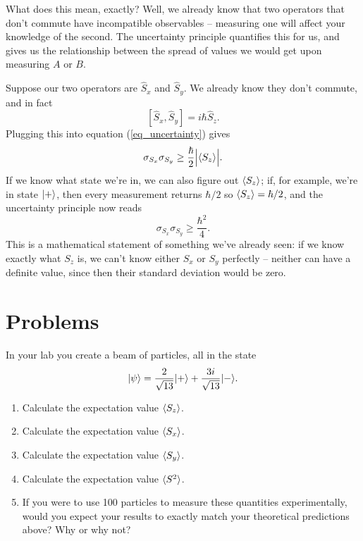 What does this mean, exactly?  Well, we already know that two operators that don't commute have incompatible observables -- measuring one will affect your knowledge of the second.  The uncertainty principle quantifies this for us, and gives us the relationship between the spread of values we would get upon measuring $A$ or $B$.  


\begin{example}

Suppose our two operators are $\hat{S}_x$ and $\hat{S}_y$.  We already know they don't commute, and in fact 
\[
[\hat{S}_x, \hat{S}_y] = i \hbar \hat{S}_z.
\]
Plugging this into equation (\ref{eq_uncertainty}) gives
\[
\sigma_{S_x} \sigma_{S_y} \ge \frac{\hbar}{2} \Big| \langle S_z \rangle \Big|.
\]
If we know what state we're in, we can also figure out $\langle S_z \rangle$; if, for example, we're in state $| + \rangle$, then every measurement returns $\hbar/2$ so $\langle S_z \rangle = \hbar/2$, and the uncertainty principle now reads
\[
\sigma_{S_x} \sigma_{S_y} \ge \frac{\hbar^2}{4}.
\]
This is a mathematical statement of something we've already seen: if we know exactly what $S_z$ is, we can't know either $S_x$ or $S_y$ perfectly -- neither can have a definite value, since then their standard deviation would be zero.

\end{example}

\newpage

\section*{Problems}
%

\begin{problem}
\label{prob_exp_val}

In your lab you create a beam of particles, all in the state
\[
| \psi \rangle = \frac{2}{\sqrt{13}} | + \rangle + \frac{3i}{\sqrt{13}} | - \rangle.
\]
\begin{enumerate}[label=(\alph*)]
\item Calculate the expectation value $\langle S_z \rangle$.
\item Calculate the expectation value $\langle S_x \rangle$.
\item Calculate the expectation value $\langle S_y \rangle$.
\item Calculate the expectation value $\langle S^2 \rangle$.
\item If you were to use 100 particles to measure these quantities experimentally, would you expect your results to exactly match your theoretical predictions above?  Why or why not?
\end{enumerate}
\end{problem}

